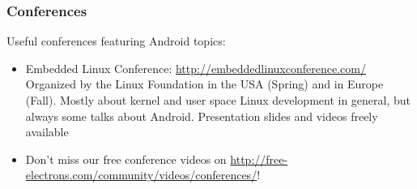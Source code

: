 \begin{frame}
  \frametitle{Conferences}
  Useful conferences featuring Android topics:
  \begin{itemize}
  \item Embedded Linux Conference: \url{http://embeddedlinuxconference.com/}\\
    Organized by the Linux Foundation in the USA (Spring)
    and in Europe (Fall). Mostly about kernel and user space Linux
    development in general, but always some talks about
    Android. Presentation slides and videos freely available
  \item Don't miss our free conference videos on
    \url{http://free-electrons.com/community/videos/conferences/}!
  \end{itemize}
\end{frame}
